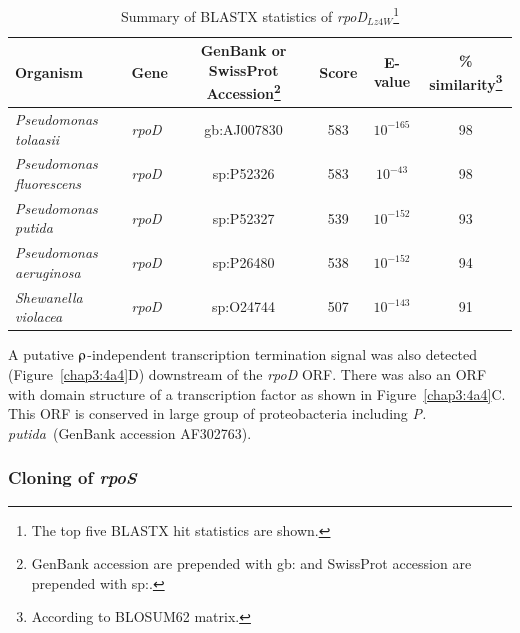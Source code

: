 \begin{table}[tbp]
\begin{minipage}[c]{\textwidth}

\renewcommand{\footnoterule}{}
\caption[Summary of BLASTX statistics of
\emph{rpoD}$_{Lz4W}$]{Summary of BLASTX statistics of
\emph{rpoD}$_{Lz4W}$\protect\footnote{The top five BLASTX hit
statistics are shown.}} \label{chap3:4a4_blast}
\begin{narrow}{-1in}{-1in} \centering
\begin{small}
\begin{tabular}{llcccc}\toprule
\textbf{Organism} & \textbf{Gene} &
\multicolumn{1}{p{1.1in}}{\textbf{GenBank or Swiss\-Prot
Accession}\protect\footnote{GenBank accession are prepended with
gb: and SwissProt accession are prepended with sp:.}} &
\textbf{Score} & \textbf{E-value} & \textbf{\%
similarity}\protect\footnote{According to BLOSUM62
matrix.}\\\midrule\addlinespace \emph{Pseudomonas tolaasii} &
\emph{rpoD} & gb:AJ007830
 & 583 & $10^{-165}$ & 98 \\
\emph{Pseudomonas fluorescens} & \emph{rpoD} & sp:P52326
 & 583 &$10^{-43}$ &98\\
\emph{Pseudomonas putida} & \emph{rpoD} & sp:P52327 &
539  & $10^{-152}$ & 93\\
\emph{Pseudomonas aeruginosa} & \emph{rpoD} & sp:P26480 & 538 &
$10^{-152}$ & 94\\
\emph{Shewanella violacea} & \emph{rpoD} & sp:O24744 & 507 &
$10^{-143}$ & 91 \\
\bottomrule
\end{tabular}
\end{small}
\end{narrow}
\end{minipage}
\end{table}

A putative $\rhoup$-independent transcription termination signal
was also detected (Figure~\ref{chap3:4a4}D) downstream of the
\emph{rpoD} ORF. There was also an ORF with domain structure of a
transcription factor as shown in Figure~\ref{chap3:4a4}C. This ORF
is conserved in large group of proteobacteria including \emph{P.
putida}~(GenBank accession AF302763).

\subsubsection{Cloning of \emph{rpoS}}




